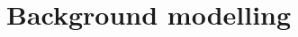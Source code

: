\begin{figure}[!htbp]
    \label{Figure:Chapter6_ZPT_Reweighting_ee}
\end{figure}

\section{Background modelling}
\label{Section:Chapter7_Background_Modelling}


